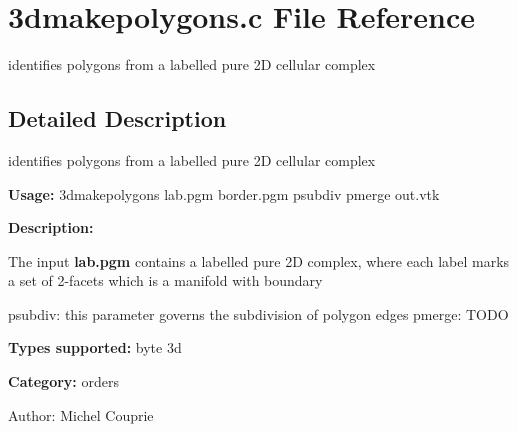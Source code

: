\section{3dmakepolygons.c File Reference}
\label{3dmakepolygons_8c}
identifies polygons from a labelled pure 2D cellular complex  




\label{_details}
\subsection{Detailed Description}
identifies polygons from a labelled pure 2D cellular complex 

{\bf Usage:} 3dmakepolygons lab.pgm border.pgm psubdiv pmerge out.vtk

{\bf Description:}

The input {\bf lab.pgm} contains a labelled pure 2D complex, where each label marks a set of 2-facets which is a manifold with boundary

psubdiv: this parameter governs the subdivision of polygon edges pmerge: TODO

{\bf Types supported:} byte 3d

{\bf Category:} orders

\begin{Desc}
\item[Author:]Michel Couprie \end{Desc}
